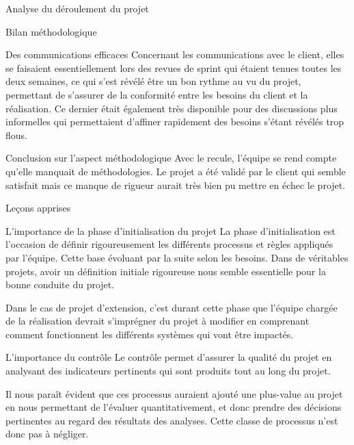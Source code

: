 \documentclass[]{article}
\begin{document}
{\begin{section}{Analyse du déroulement du projet}
\begin{subsection}{Bilan méthodologique}
\begin{subsubsection}{Des communications efficaces}
         Concernant les communications avec le client, elles se faisaient essentiellement lors des revues de sprint qui étaient tenues toutes les deux semaines, ce qui s'est révélé être un bon rythme au vu du projet, permettant de s'assurer de la conformité entre les besoins du client et la réalisation. Ce dernier était également très disponible pour des discussions plus informelles qui permettaient d'affiner rapidement des besoins s'étant révélés trop flous.
     \end{subsubsection}

     \begin{subsubsection}{Conclusion sur l'aspect méthodologique}
        Avec le recule, l'équipe se rend compte qu'elle manquait de méthodologies. Le projet a été validé par le client qui semble satisfait mais ce manque de rigueur aurait très bien pu mettre en échec le projet.
     \end{subsubsection}
 \end{subsection}
\end{section}

\begin{section}{Leçons apprises}
 \begin{subsection}{L'importance de la phase d'initialisation du projet}
     La phase d'initialisation est l'occasion de définir rigoureusement les différents processus et règles appliqués par l'équipe. Cette base évoluant par la suite selon les besoins. Dans de véritables projets, avoir un définition initiale rigoureuse nous semble essentielle pour la bonne conduite du projet.

     Dans le cas de projet d'extension, c'est durant cette phase que l'équipe chargée de la réalisation devrait s'imprégner du projet à modifier en comprenant comment fonctionnent les différents systèmes qui vont être impactés.
 \end{subsection}

 \begin{subsection}{L'importance du contrôle}
     Le contrôle permet d'assurer la qualité du projet en analysant des indicateurs pertinents qui sont produits tout au long du projet.

     Il nous paraît évident que ces processus auraient ajouté une plus-value au projet en nous permettant de l'évaluer quantitativement, et donc prendre des décisions pertinentes au regard des résultats des analyses. Cette classe de processus n'est donc pas à négliger.
 \end{subsection}


\end{section}}
\end{document}
